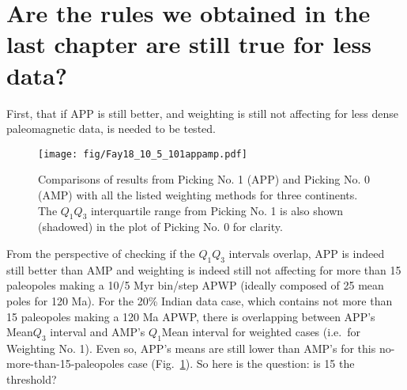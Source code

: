 \section{Are the rules we obtained in the last chapter are still true for less
data?}

First, that if APP is still better, and weighting is still not affecting for
less dense paleomagnetic data, is needed to be tested.

\begin{figure}
    \centering
        \texttt{[image: fig/Fay18\_10\_5\_101appamp.pdf]}
    \captionsetup{width=1\textwidth}
    \caption{Comparisons of results from Picking No. 1 (APP) and Picking No. 0
	(AMP) with all the listed weighting methods for three continents. The
	$Q_1$\textendash$Q_3$ interquartile range from Picking No. 1 is also shown
	(shadowed) in the plot of Picking No. 0 for clarity.}\label{Fig:Fay18_10_5_101appamp}
\end{figure}

From the perspective of checking if the $Q_1$\textendash$Q_3$ intervals overlap,
APP is indeed still better than AMP and weighting is indeed still not affecting
for more than 15 paleopoles making a 10/5 Myr bin/step APWP (ideally composed of
25 mean poles for 120 Ma). For the 20\% Indian data case, which
contains not more than 15 paleopoles making a 120 Ma APWP, there is
overlapping between APP's Mean\textendash$Q_3$ interval and AMP's
$Q_1$\textendash{}Mean interval for weighted cases (i.e.\ for Weighting No.
1). Even so, APP's means are still lower than AMP's for this
no-more-than-15-paleopoles case (Fig.~\ref{Fig:Fay18_10_5_101appamp}). So here
is the question: is 15 the threshold?
